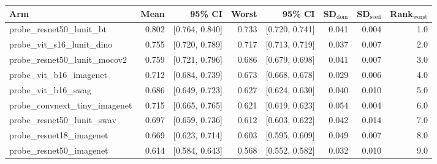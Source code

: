 \begin{tabular}{lrrrrrrr}
\toprule
Arm & Mean & 95\% CI & Worst & 95\% CI & SD$_\text{dom}$ & SD$_\text{seed}$ & Rank$_\text{worst}$ \\
\midrule
probe\_resnet50\_lunit\_bt & 0.802 & [0.764, 0.840] & 0.733 & [0.720, 0.741] & 0.041 & 0.004 & 1.0 \\
probe\_vit\_s16\_lunit\_dino & 0.755 & [0.720, 0.789] & 0.717 & [0.713, 0.719] & 0.037 & 0.007 & 2.0 \\
probe\_resnet50\_lunit\_mocov2 & 0.759 & [0.721, 0.796] & 0.686 & [0.679, 0.698] & 0.041 & 0.007 & 3.0 \\
probe\_vit\_b16\_imagenet & 0.712 & [0.684, 0.739] & 0.673 & [0.668, 0.678] & 0.029 & 0.006 & 4.0 \\
probe\_vit\_b16\_swag & 0.686 & [0.649, 0.723] & 0.627 & [0.624, 0.630] & 0.040 & 0.010 & 5.0 \\
probe\_convnext\_tiny\_imagenet & 0.715 & [0.665, 0.765] & 0.621 & [0.619, 0.623] & 0.054 & 0.004 & 6.0 \\
probe\_resnet50\_lunit\_swav & 0.697 & [0.659, 0.736] & 0.612 & [0.603, 0.622] & 0.042 & 0.014 & 7.0 \\
probe\_resnet18\_imagenet & 0.669 & [0.623, 0.714] & 0.603 & [0.595, 0.609] & 0.049 & 0.007 & 8.0 \\
probe\_resnet50\_imagenet & 0.614 & [0.584, 0.643] & 0.568 & [0.552, 0.582] & 0.032 & 0.010 & 9.0 \\
\bottomrule
\end{tabular}
